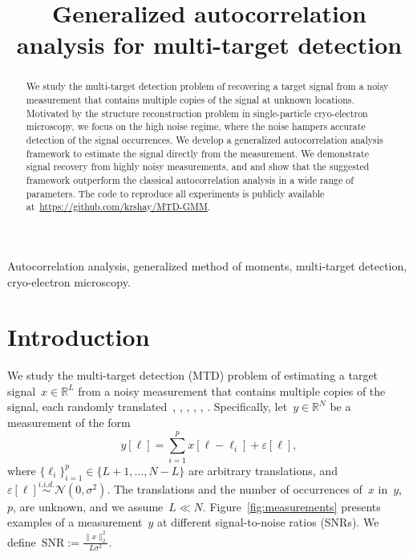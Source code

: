 \documentclass{article}
\title{Generalized autocorrelation analysis for multi-target detection}
\begin{document}
%
\maketitle
%
\begin{abstract}
We study the multi-target detection problem of recovering a target signal from a noisy measurement that contains multiple copies of the signal at unknown locations. Motivated by the structure reconstruction problem in single-particle cryo-electron microscopy, we focus on the high noise regime, where the noise hampers accurate detection of the signal occurrences. We develop a generalized autocorrelation analysis framework to estimate the signal directly from the measurement. We demonstrate signal recovery from highly noisy measurements, and and show that the suggested framework outperform the classical autocorrelation analysis in a wide range of parameters. The code to reproduce all experiments is publicly available at~\url{https://github.com/krshay/MTD-GMM}.
\end{abstract}
%
\begin{keywords}
Autocorrelation analysis, generalized method of moments, multi-target detection, cryo-electron microscopy.
\end{keywords}
%
\section{Introduction}
\label{sec:intro}
We study the multi-target detection (MTD) problem of estimating a target signal~$x \in \mathbb{R}^L$ from a noisy measurement that contains multiple copies of the signal, each randomly translated~\cite{bendory2019multi}, \cite{lan2020multi}, \cite{marshall2020image}, \cite{bendory2021multi}, \cite{kreymer2021two}, \cite{bendory2018toward}. Specifically, let~$y \in \mathbb{R}^N$ be a measurement of the form
\begin{equation}
\label{eq:model}
y[\ell] = \sum_{i=1}^{p} x[\ell - \ell_i] + \varepsilon[\ell],
\end{equation}
where \mbox{$\{\ell_i\}_{i=1}^{p} \in \{L + 1, \ldots, N-L\}$} are arbitrary translations, and~$\varepsilon[\ell]\overset{i.i.d.}{\sim} \mathcal{N}(0,\sigma^2)$. The translations and the number of occurrences of~$x$ in~$y$,~$p$, are unknown, and we assume~$L \ll N$. Figure~\ref{fig:measurements} presents examples of a measurement~$y$ at different signal-to-noise ratios (SNRs). We define~\mbox{$\text{SNR} := \frac{\|x\|_2^2}{L \sigma^2}$}.
\end{document}
